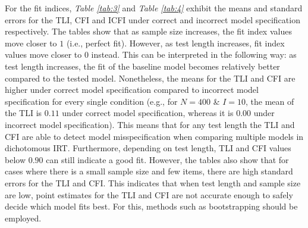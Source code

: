 \documentclass[Royal,sageapa,times,doublespace]{sagej}
\begin{document}
\indent For the fit indices, \textit{Table \ref{tab:3}} and \textit{Table \ref{tab:4}} exhibit the means and standard errors for the TLI, CFI and ICFI under correct and incorrect model specification respectively. The tables show that as sample size increases, the fit index values move closer to $1$ (i.e., perfect fit). However, as test length increases, fit index values move closer to $0$ instead. This can be interpreted in the following way: as test length increases, the fit of the baseline model becomes relatively better compared to the tested model. Nonetheless, the means for the TLI and CFI are higher under correct model specification compared to incorrect model specification for every single condition (e.g., for $N = 400$ \& $I = 10$, the mean of the TLI is $0.11$ under correct model specification, whereas it is $0.00$ under incorrect model specification). This means that for any test length the TLI and CFI are able to detect model misspecification when comparing multiple models in dichotomous IRT. Furthermore, depending on test length, TLI and CFI values below $0.90$ can still indicate a good fit. However, the tables also show that for cases where there is a small sample size and few items, there are high standard errors for the TLI and CFI. This indicates that when test length and sample size are low, point estimates for the TLI and CFI are not accurate enough to safely decide which model fits best. For this, methods such as bootstrapping should be employed. \\
\end{document}
